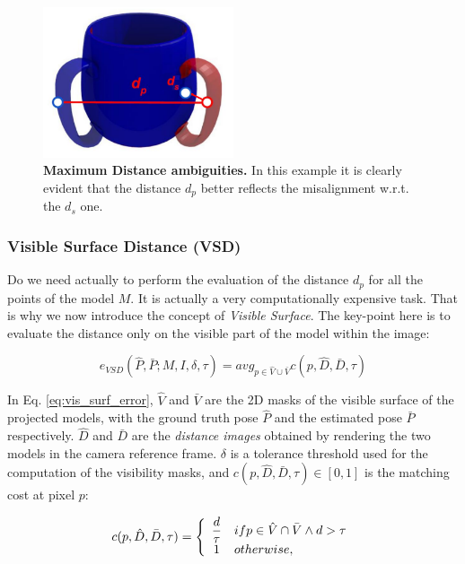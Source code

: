 \begin{figure}
    \centering
    \includegraphics[width=0.5\textwidth]{figures/2_benchmarks_and_metrics/ds_vs_dp}
    \caption{\textbf{Maximum Distance ambiguities.} In this example it is clearly evident that the distance $d_p$ better reflects the misalignment w.r.t. the $d_s$ one.} 
    \label{fig:ds_vs_dp}
\end{figure}

\subsubsection{Visible Surface Distance (VSD)}\label{subsubsec:visible_surface_distance}
Do we need actually to perform the evaluation of the distance $d_p$ for all the points of the model $M$. It is actually a very computationally expensive task. That is why we now introduce the concept of \emph{Visible Surface}. The key-point here is to evaluate the distance only on the visible part of the model within the image:

\begin{equation}
    \label{eq:vis_surf_error}
    e_{VSD}(\hat{P}, \bar{P}; M, I, \delta, \tau) = avg_{p \in \hat{V} \cup \bar{V}} c(p, \hat{D}, \bar{D}, \tau)
\end{equation}

In Eq. \ref{eq:vis_surf_error}, $\hat{V}$ and $\bar{V}$ are the 2D masks of the visible surface of the projected models, with the ground truth pose $\hat{P}$ and the estimated pose $\bar{P}$ respectively. $\hat{D}$ and $\bar{D}$ are the \emph{distance images} obtained by rendering the two models in the camera reference frame. $\delta$ is a tolerance threshold used for the computation of the visibility masks, and $c(p, \hat{D}, \bar{D}, \tau) \in [0, 1]$ is the matching cost at pixel $p$:

\begin{equation}
    \label{eq:matching_cost_at_p}
    c(p, \hat{D}, \bar{D}, \tau) = \left\{
\begin{array}{c l}	
     \dfrac{d}{\tau} & if p \in \hat{V} \cap \bar{V} \wedge d > \tau \\
     1 & otherwise,
\end{array}\right.
\end{equation}

